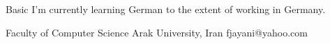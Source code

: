 \documentclass[a4paper,12pt]{memoir} %
\begin{document}
{Basic}
{I'm currently learning German to the extent of working in Germany.}


\Sep %




{Faculty of Computer Science}
{Arak University, Iran}
{fjayani@yahoo.com}




\Sep %
\end{document}
